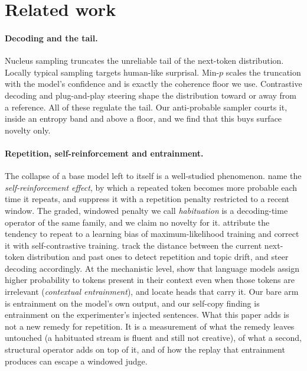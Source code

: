 \section{Related work}
\label{sec:related}

\paragraph{Decoding and the tail.} Nucleus sampling \citep{holtzman2020curious}
truncates the unreliable tail of the next-token distribution. Locally
typical sampling \citep{meister2023typical} targets human-like surprisal.
Min-$p$ \citep{nguyen2025minp} scales the truncation with the model's
confidence and is exactly the coherence floor we use. Contrastive decoding
\citep{li2023contrastive} and plug-and-play steering \citep{dathathri2020pplm}
shape the distribution toward or away from a reference. All of these
regulate the tail. Our anti-probable sampler courts it, inside an entropy
band and above a floor, and we find that this buys surface novelty only.

\paragraph{Repetition, self-reinforcement and entrainment.} The collapse of
a base model left to itself is a well-studied phenomenon.
\citet{zhu-etal-2023-penalty} name the \emph{self-reinforcement effect}, by
which a repeated token becomes more probable each time it repeats, and
suppress it with a repetition penalty restricted to a recent window. The
graded, windowed penalty we call \emph{habituation} is a decoding-time
operator of the same family, and we claim no novelty for it.
\citet{guan-huang-2023-mitigating} attribute the tendency to repeat to a
learning bias of maximum-likelihood training and correct it with
self-contrastive training. \citet{xu-etal-2023-look} track the distance
between the current next-token distribution and past ones to detect
repetition and topic drift, and steer decoding accordingly. At the
mechanistic level, \citet{niu-etal-2025-llama} show that language models
assign higher probability to tokens present in their context even when those
tokens are irrelevant (\emph{contextual entrainment}), and locate heads that
carry it. Our bare arm is entrainment on the model's own output, and our
self-copy finding is entrainment on the experimenter's injected sentences.
What this paper adds is not a new remedy for repetition. It is a measurement
of what the remedy leaves untouched (a habituated stream is fluent and still
not creative), of what a second, structural operator adds on top of it, and
of how the replay that entrainment produces can escape a windowed judge.

